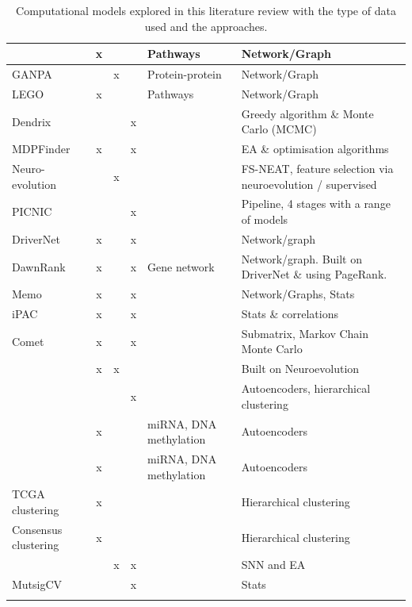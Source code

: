 \begin{appendices}
\begin{center}
\begin{small}
\begin{longtable}{|p{3cm}|c|p{1.2cm}|c|p{2.0cm}|p{4.0cm}|}
    \endlastfoot    
    \citet{Cava2018-rv} & x &  &  & Pathways & Network/Graph \\ \hline
    GANPA &  & x &  & Protein-protein & Network/Graph \\ \hline
    LEGO & x &  &  & Pathways & Network/Graph \\ \hline
    Dendrix &  &  & x &  & Greedy algorithm \& Monte Carlo (MCMC) \\ \hline
    MDPFinder & x &  & x &  & EA \& optimisation algorithms \\ \hline
    Neuro-evolution &  & x &  &  & FS-NEAT, feature selection via neuroevolution / supervised \\ \hline
    PICNIC  &  &  & x &  & Pipeline, 4 stages with a range of models \\ \hline
    DriverNet & x &  & x &  & Network/graph \\ \hline
    DawnRank & x &  & x & Gene network & Network/graph. Built on DriverNet \& using PageRank. \\ \hline
    Memo & x &  & x &  & Network/Graphs, Stats \\ \hline
    iPAC & x &  & x &  & Stats \& correlations \\ \hline
    Comet  & x &  & x &  & Submatrix, Markov Chain Monte Carlo  \\ \hline
    \citet{Feltes2019-bd} & x & x &  &  & Built on Neuroevolution \\ \hline
    \citet{Palazzo2019-hx} &  &  & x &  & Autoencoders, hierarchical clustering \\ \hline
    \citet{Chaudhary2018-qj} & x &  &  & miRNA, DNA methylation & Autoencoders \\ \hline
    \citet{Ma2019-hk} & x &  &  & miRNA, DNA methylation & Autoencoders \\ \hline
    TCGA clustering & x &  &  &  & Hierarchical clustering \\ \hline
    Consensus clustering & x &  &  &  & Hierarchical clustering \\ \hline
    \citet{Capecci2020-uj} &  & x & x &  & SNN and EA \\ \hline
    MutsigCV &  &  & x &  & Stats \\ \hline
    \caption{Computational models explored in this literature review with the type of data used and the approaches.}
    \label{tab:data_used}
\end{longtable}
\end{small}
\end{center}
    


\end{appendices}
